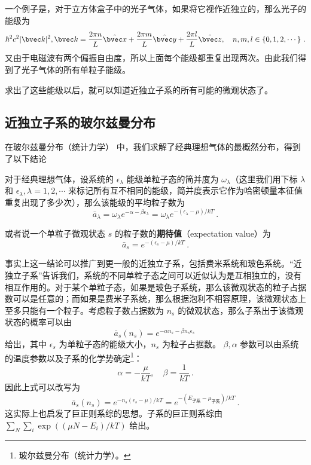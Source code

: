 一个例子是，对于立方体盒子中的光子气体，如果将它视作近独立的，那么光子的能级为
\begin{equation}
\hbar^2c^2 |\bvec k|^2,\bvec k=\frac{2\pi n}{L}\hat{\bvec x}+\frac{2\pi m}{L}\hat{\bvec y}+\frac{2\pi l}{L}\hat{\bvec z},\quad n,m,l\in \{0,1,2,\cdots\}~.
\end{equation}
又由于电磁波有两个偏振自由度，所以上面每个能级都重复出现两次。由此我们得到了光子气体的所有单粒子能级。

求出了这些能级以后，就可以知道近独立子系的所有可能的微观状态了。


\subsection{近独立子系的玻尔兹曼分布}
在玻尔兹曼分布（统计力学） 中，我们求解了经典理想气体的最概然分布，得到了以下结论
\begin{theorem}{}
对于经典理想气体，设系统的 $\epsilon_\lambda$ 能级单粒子态的简并度为 $\omega_\lambda$（这里我们用下标 $\lambda$ 和 $\epsilon_\lambda,\lambda=1,2,\cdots$ 来标记所有互不相同的能级，简并度表示它作为哈密顿量本征值重复出现了多少次），那么该能级的平均粒子数为
\begin{equation}
\bar a_\lambda = \omega_\lambda e^{-\alpha-\beta\epsilon_\lambda}=
\omega_\lambda e^{-(\epsilon_\lambda-\mu)/kT}~.
\end{equation}


或者说一个单粒子微观状态 $s$ 的粒子数的\textbf{期待值}（expectation value）为
\begin{equation}
\bar a_s= e^{-(\epsilon_s-\mu)/kT}~.
\end{equation}
\end{theorem}

事实上这一结论可以推广到更一般的近独立子系，包括费米系统和玻色系统。“近独立子系”告诉我们，系统的不同单粒子态之间可以近似认为是互相独立的，没有相互作用的。对于某个单粒子态，如果是玻色子系统，那么该微观状态的粒子占据数可以是任意的；而如果是费米子系统，那么根据泡利不相容原理，该微观状态上至多只能有一个粒子。考虑粒子数占据数为 $n_s$ 的微观状态，那么子系出于该微观状态的概率可以由 
\begin{equation}
\bar a_s(n_s) =  e^{-\alpha n_s-\beta n_s \epsilon_s}~
\end{equation}
给出，其中 $\epsilon_s$ 为单粒子态的能级大小，$n_s$ 为粒子占据数。
$\beta,\alpha$ 参数可以由系统的温度参数以及子系的化学势确定\footnote{玻尔兹曼分布（统计力学）。}：
\begin{equation}
\alpha=-\frac{\mu}{kT},\quad \beta=\frac{1}{kT}~.
\end{equation}
因此上式可以改写为
\begin{equation}
\bar a_s(n_s)= e^{-n_s(\epsilon_s-\mu)/kT}= e^{-(E_\text{子系}-\mu_\text{子系})/kT}~.
\end{equation}
这实际上也启发了巨正则系综的思想。子系的巨正则系综由 $\sum_N \sum_i \exp((\mu N-E_i)/kT)$ 给出。

